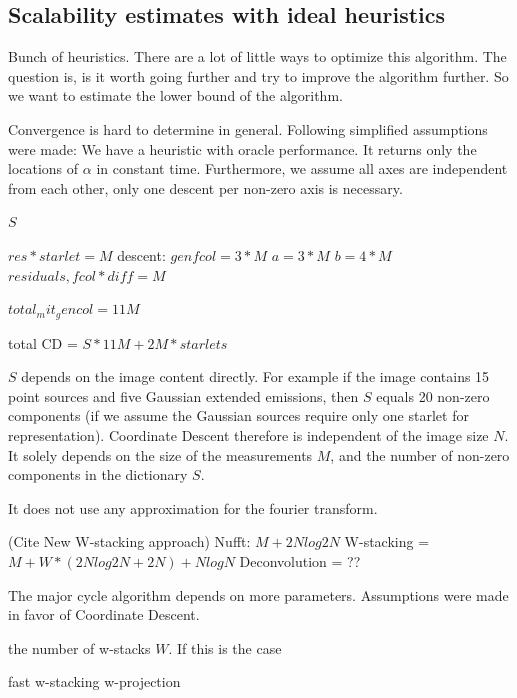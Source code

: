 \subsection{Scalability estimates with ideal heuristics}
Bunch of heuristics. There are a lot of little ways to optimize this algorithm. The question is, is it worth going further and try to improve the algorithm further. So we want to estimate the lower bound of the algorithm.

Convergence is hard to determine in general. Following simplified assumptions were made: We have a heuristic with oracle performance. It returns only the locations of $\alpha$ in constant time. Furthermore, we assume all axes are independent from each other, only one descent per non-zero axis is necessary.

$S$


$res * starlet = M$
descent:
$gen fcol = 3*M$
$a = 3 * M$
$b = 4 * M$
$residuals, fcol*diff =  M$

$total_mit_gencol = 11M$

total CD = $S * 11M + 2M * starlets$

$S$ depends on the image content directly. For example if the image contains 15 point sources and five Gaussian extended emissions, then $S$ equals 20 non-zero components (if we assume the Gaussian sources require only one starlet for representation). Coordinate Descent therefore is independent of the image size $N$. It solely depends on the size of the measurements $M$, and the number of non-zero components in the dictionary $S$. 

It does not use any approximation for the fourier transform.



(Cite New W-stacking approach)
Nufft: $M + 2N log 2N$
W-stacking = $M + W*(2N log 2N + 2N) + N log N$
Deconvolution = ??

The major cycle algorithm depends on more parameters. Assumptions were made in favor of Coordinate Descent.

the number of w-stacks $W$. If this is the case

\cite{pratley2018fast} fast w-stacking w-projection

